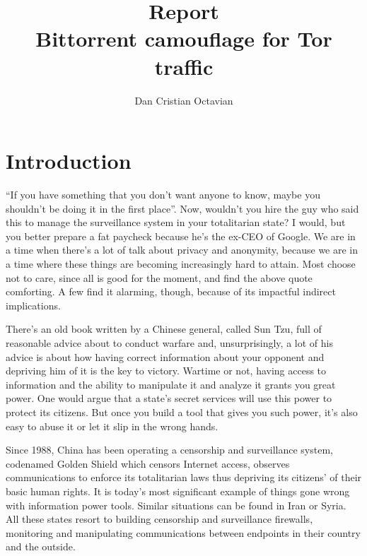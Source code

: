 \documentclass[11pt]{article} %
\title{Report \\ Bittorrent camouflage for Tor traffic}
\author{Dan Cristian Octavian}
\begin{document}
\newcommand{\myparagraph}[1]{\paragraph{#1}\mbox{}\\}
\maketitle

\listoftodos

\tableofcontents

\newpage



\section{Introduction}

 “If you have something that you don’t want anyone to know, maybe you shouldn’t be doing it in the first place”. Now, wouldn’t you hire the guy who said this to manage the surveillance system in your totalitarian state? I would, but you better prepare a fat paycheck because he’s the ex-CEO of Google. We are in a time when there’s a lot of talk about privacy and anonymity, because we are in a time where these things are becoming increasingly hard to attain. Most choose not to care, since all is good for the moment, and find the above quote comforting. A few find it alarming, though, because of its impactful indirect implications.

There’s an old book written by a Chinese general, called Sun Tzu, full of reasonable advice about to conduct warfare and, unsurprisingly, a lot of his advice is about how having correct information about your opponent and depriving him of it is the key to victory. Wartime or not, having access to information and the ability to manipulate it and analyze it grants you great power. One would argue that a state’s secret services will use this power to protect its citizens. But once you build a tool that gives you such power, it’s also easy to abuse it or let it slip in the wrong hands.

Since 1988, China has been operating a censorship and surveillance system, codenamed Golden Shield which censors Internet access, observes communications to enforce its totalitarian laws thus depriving its citizens’ of their basic human rights. It is today’s most significant example of things gone wrong with information power tools. Similar situations can be found in Iran or Syria. All these states resort to building censorship and surveillance firewalls, monitoring and manipulating communications between endpoints in their country and the outside.
\end{document}
